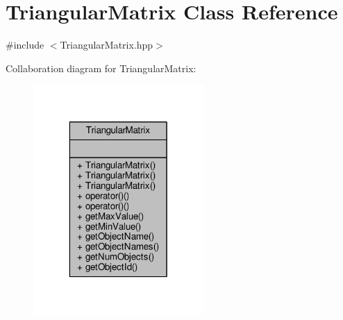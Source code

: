 \hypertarget{classTriangularMatrix}{\section{Triangular\-Matrix Class Reference}
\label{classTriangularMatrix}
}


{\ttfamily \#include $<$Triangular\-Matrix.\-hpp$>$}



Collaboration diagram for Triangular\-Matrix\-:\nopagebreak
\begin{figure}[H]
\begin{center}
\leavevmode
\includegraphics[width=184pt]{classTriangularMatrix__coll__graph}
\end{center}
\end{figure}
